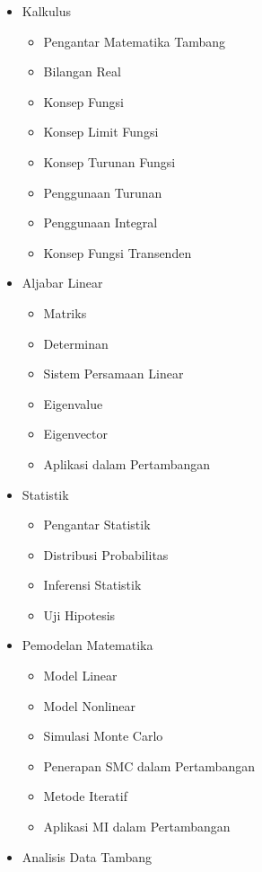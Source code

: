 \documentclass[
]{book}
\providecommand{\tightlist}{%
  \setlength{\itemsep}{0pt}\setlength{\parskip}{0pt}}
\begin{document}
\begin{itemize}
\tightlist
\item
  Kalkulus

  \begin{itemize}
  \tightlist
  \item
    Pengantar Matematika Tambang
  \item
    Bilangan Real
  \item
    Konsep Fungsi
  \item
    Konsep Limit Fungsi
  \item
    Konsep Turunan Fungsi
  \item
    Penggunaan Turunan
  \item
    Penggunaan Integral
  \item
    Konsep Fungsi Transenden
  \end{itemize}
\item
  Aljabar Linear

  \begin{itemize}
  \tightlist
  \item
    Matriks
  \item
    Determinan
  \item
    Sistem Persamaan Linear
  \item
    Eigenvalue
  \item
    Eigenvector
  \item
    Aplikasi dalam Pertambangan
  \end{itemize}
\item
  Statistik

  \begin{itemize}
  \tightlist
  \item
    Pengantar Statistik
  \item
    Distribusi Probabilitas
  \item
    Inferensi Statistik
  \item
    Uji Hipotesis
  \end{itemize}
\item
  Pemodelan Matematika

  \begin{itemize}
  \tightlist
  \item
    Model Linear
  \item
    Model Nonlinear
  \item
    Simulasi Monte Carlo
  \item
    Penerapan SMC dalam Pertambangan
  \item
    Metode Iteratif
  \item
    Aplikasi MI dalam Pertambangan
  \end{itemize}
\item
  Analisis Data Tambang


\end{itemize}
\end{document}
